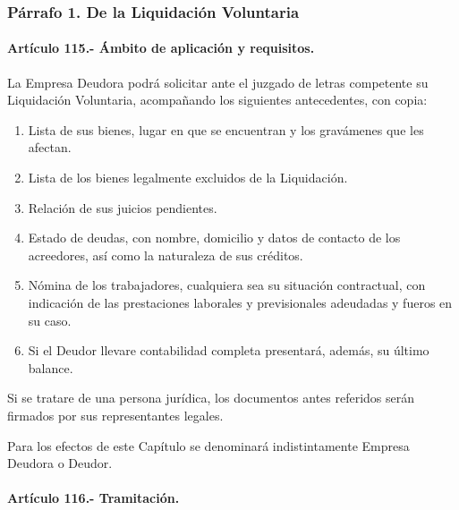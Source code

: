 \documentclass[
]{book}
\begin{document}
\hypertarget{puxe1rrafo-1.-de-la-liquidaciuxf3n-voluntaria}{%
\subsubsection*{Párrafo 1. De la Liquidación Voluntaria}\label{puxe1rrafo-1.-de-la-liquidaciuxf3n-voluntaria}}

\hypertarget{artuxedculo-115.--uxe1mbito-de-aplicaciuxf3n-y-requisitos.}{%
\paragraph*{Artículo 115.- Ámbito de aplicación y requisitos.}\label{artuxedculo-115.--uxe1mbito-de-aplicaciuxf3n-y-requisitos.}}

La Empresa Deudora podrá solicitar ante el juzgado de letras competente su Liquidación Voluntaria, acompañando los siguientes antecedentes, con copia:

\begin{enumerate}
\def\labelenumi{\arabic{enumi})}
\item
  Lista de sus bienes, lugar en que se encuentran y los gravámenes que les afectan.
\item
  Lista de los bienes legalmente excluidos de la Liquidación.
\item
  Relación de sus juicios pendientes.
\item
  Estado de deudas, con nombre, domicilio y datos de contacto de los acreedores, así como la naturaleza de sus créditos.
\item
  Nómina de los trabajadores, cualquiera sea su situación contractual, con indicación de las prestaciones laborales y previsionales adeudadas y fueros en su caso.
\item
  Si el Deudor llevare contabilidad completa presentará, además, su último balance.
\end{enumerate}

Si se tratare de una persona jurídica, los documentos antes referidos serán firmados por sus representantes legales.

Para los efectos de este Capítulo se denominará indistintamente Empresa Deudora o Deudor.

\hypertarget{artuxedculo-116.--tramitaciuxf3n.}{%
\paragraph*{Artículo 116.- Tramitación.}\label{artuxedculo-116.--tramitaciuxf3n.}}
\end{document}
